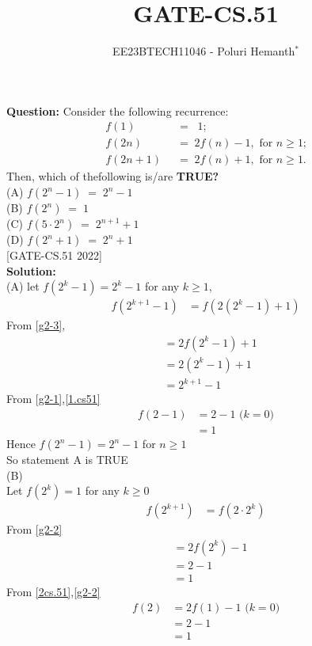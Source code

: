 \documentclass[journal,12pt,twocolumn]{IEEEtran}
\theoremstyle{remark}
\begin{document}

\vspace{3cm}

\title{GATE-CS.51}
\author{EE23BTECH11046 - Poluri Hemanth$^{*}$}
\maketitle
\textbf{Question:}
Consider the following recurrence:
\begin{align}
	f(1)\;\;&=\;\;1;\label{g2-1}\\
	 f(2n)\;\;&=\;2f(n)-1,\text{  for $n\geq$1;}\label{g2-2}\\
	 f(2n+1)\;\;&=\;2f(n)+1,\text{  for $n\geq$1.}\label{g2-3}
\end{align}
Then, which of thefollowing is/are \textbf{TRUE?}\\
(A) $f(2^n-1)\;=\;2^n-1$\\
(B) $f(2^n)\;=\;1$\\
(C) $f(5\cdot2^n)\;=\;2^{n+1}+1$\\
(D) $f(2^n+1)\;=\;2^n+1$\\
\hfill{[GATE-CS.51 2022]}\\
\textbf{Solution:}\\
(A)
let $f(2^k-1)=2^k-1$ for any $k\geq1$,
\begin{align}
	f(2^{k+1}-1)&=f(2(2^k-1)+1)
\end{align}
From \eqref{g2-3},
\begin{align}
	&=2f(2^k-1)+1\\
        &=2(2^k-1)+1\\
	&=2^{k+1}-1\label{1.cs51}
\end{align}
From \eqref{g2-1},\eqref{1.cs51}
\begin{align}
	f(2-1)&=2-1\text{  ($k=0$)}\\
	&=1
\end{align}
Hence $f(2^n-1)=2^n-1$ for $n\geq1$\\
So statement A is TRUE\\
(B)\\
Let $f(2^k)=1$ for any $k\geq$0
\begin{align}
	f(2^{k+1})&=f(2\cdot2^k)
\end{align}
From \eqref{g2-2}
\begin{align}
	&=2f(2^k)-1\label{2cs.51}\\
	&=2-1\\
	&=1
\end{align}
From \eqref{2cs.51},\eqref{g2-2}
\begin{align}
	f(2)&=2f(1)-1\text{  ($k=0$)}\\
	&=2-1\\
	&=1\label{bcs.51}
\end{align}
\end{document}
